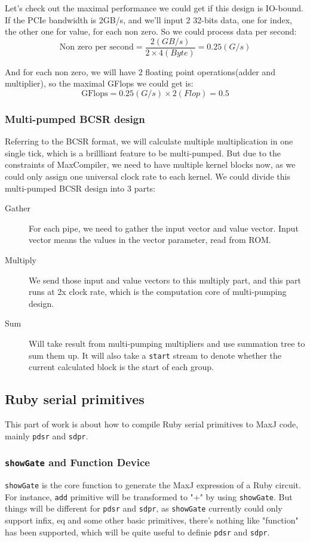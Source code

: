 Let's check out the maximal performance we could get if this design is IO-bound. If the PCIe bandwidth is 2GB/s, and we'll input 2 32-bits data, one for index, the other one for value, for each non zero. So we could process data per second:
$$ \text{Non zero per second} = \frac{2(GB/s)}{2\times4(Byte)} = 0.25(G/s) $$

And for each non zero, we will have 2 floating point operations(adder and multiplier), so the maximal GFlops we could get is:
$$ \text{GFlops} = 0.25 (G/s) \times 2(Flop) = 0.5 $$

\subsubsection{Multi-pumped BCSR design}

Referring to the BCSR format, we will calculate multiple multiplication in one single tick, which is a brillliant feature to be multi-pumped. But due to the constraints of MaxCompiler, we need to have multiple kernel blocks now, as we could only assign one universal clock rate to each kernel. We could divide this multi-pumped BCSR design into 3 parts:

\begin{description}
\item[Gather] For each pipe, we need to gather the input vector and value vector. Input vector means the values in the vector parameter, read from ROM. 
\item[Multiply] We send those input and value vectors to this multiply part, and this part runs at 2x clock rate, which is the computation core of multi-pumping design.
\item[Sum] Will take result from multi-pumping multipliers and use summation tree to sum them up. It will also take a \texttt{start} stream to denote whether the current calculated block is the start of each group.
\end{description}

\subsection{Ruby serial primitives}

This part of work is about how to compile Ruby serial primitives to MaxJ code, mainly \texttt{pdsr} and \texttt{sdpr}. 

\subsubsection{\texttt{showGate} and Function Device}
\texttt{showGate} is the core function to generate the MaxJ expression of a Ruby circuit. For instance, \texttt{add} primitive will be transformed to "+" by using \texttt{showGate}. But things will be different for \texttt{pdsr} and \texttt{sdpr}, as \texttt{showGate} currently could only support infix, eq and some other basic primitives, there's nothing like "function" has been supported, which will be quite useful to definie \texttt{pdsr} and \texttt{sdpr}.

